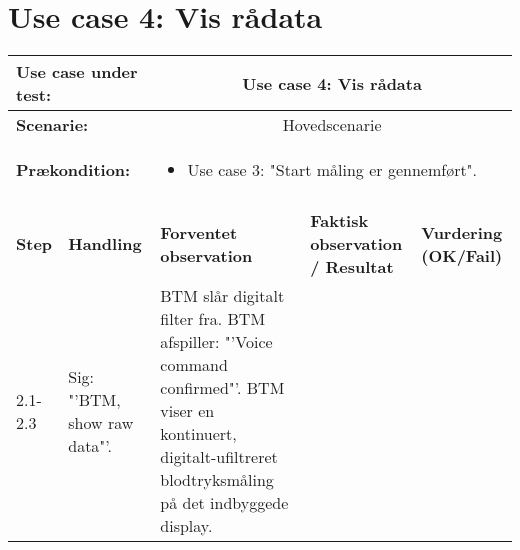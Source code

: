 \section{Use case 4: Vis rådata}
\begin{tabular}{|p{1cm}|p{3cm}|p{4cm}|p{4cm}|p{2cm}|}
\hline
\multicolumn{2}{|p{3cm}|}{\textbf{Use case under test:}} & \multicolumn{3}{c|}{Use case 4: Vis rådata} \\\hline

\multicolumn{2}{|p{3cm}|}{\textbf{Scenarie:}} & \multicolumn{3}{c|}{Hovedscenarie} \\\hline

\multicolumn{2}{|p{3cm}|}{\textbf{Prækondition:}}  & \multicolumn{3}{l|}{\parbox{0.6\textwidth}{
\begin{itemize}[label=$\circ$]
\item Use case 3: "Start måling er gennemført".  
\end{itemize} }}\\\hline

\multicolumn{5}{|c|}{} \\\hline

\textbf{Step} & \textbf{Handling} & \textbf{Forventet observation} & \textbf{Faktisk observation / Resultat} & \textbf{Vurdering (OK/Fail)}\\\hline

2.1-2.3 & Sig: "'BTM, show raw data"'. & BTM slår digitalt filter fra. BTM afspiller: "'Voice command confirmed"'. BTM viser en kontinuert, digitalt-ufiltreret blodtryksmåling på det indbyggede display.&  & \\\hline

\end{tabular}



